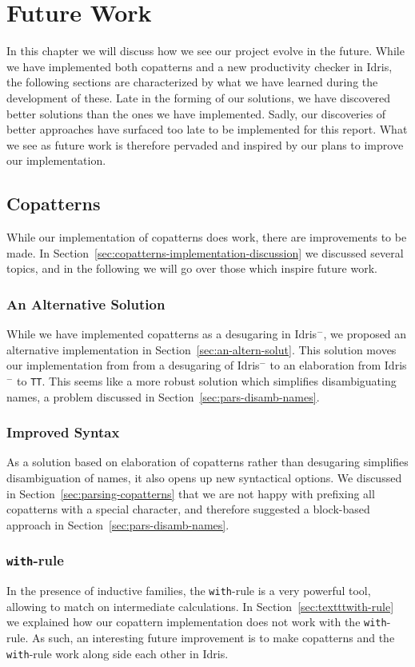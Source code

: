 
\chapter{Future Work}
\label{cha:future-work}
In this chapter we will discuss how we see our project evolve in the
future. While we have implemented both copatterns and a new productivity checker
in Idris, the following sections are characterized by what we have learned
during the development of these. Late in the forming of our solutions, we have discovered better
solutions than the ones we have implemented. Sadly, our discoveries of better
approaches have surfaced too late to be implemented for this report. What we see
as future work is therefore pervaded and inspired by our plans to improve our implementation.
\section{Copatterns}
While our implementation of copatterns does work, there are improvements to be
made. In Section~\ref{sec:copatterns-implementation-discussion} we discussed
several topics, and in the following we will go over those which inspire future work.
\subsection{An Alternative Solution}
While we have implemented copatterns as a desugaring in Idris$^-$,
we proposed an alternative implementation in
Section~\ref{sec:an-altern-solut}. This solution moves our implementation from
from a desugaring of Idris$^-$ to an elaboration from Idris$^-$ to
\texttt{TT}. This seems like a more robust solution which simplifies disambiguating
names, a problem discussed in Section~\ref{sec:pars-disamb-names}.
\subsection{Improved Syntax}
As a solution based on elaboration of copatterns rather than desugaring
simplifies disambiguation of names, it also opens up new syntactical options. We
discussed in Section~\ref{sec:parsing-copatterns} that we are not happy with
prefixing all copatterns with a special character, and therefore suggested a
block-based approach in Section~\ref{sec:pars-disamb-names}.
\subsection{\texttt{with}-rule}
In the presence of inductive families, the \texttt{with}-rule is a very powerful
tool, allowing to match on intermediate calculations. In
Section~\ref{sec:textttwith-rule} we explained how our copattern implementation
does not work with the \texttt{with}-rule. As such, an interesting future
improvement is to make copatterns and the \texttt{with}-rule work along side
each other in Idris.

